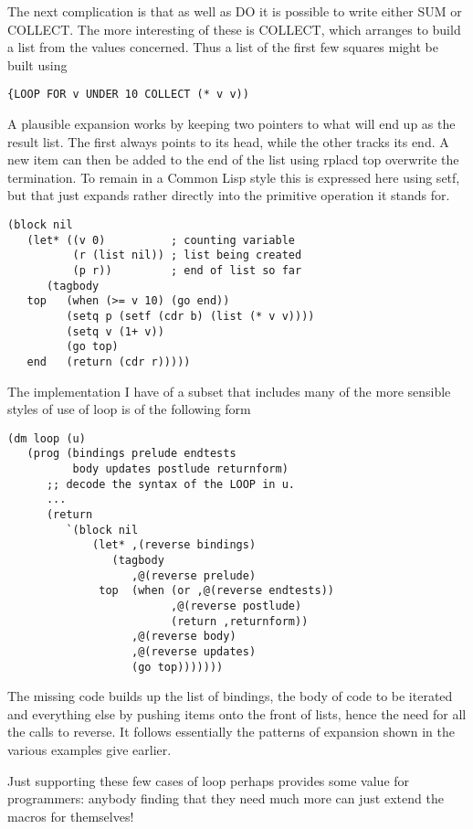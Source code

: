 The next complication is that as well as {\tx DO} it is possible to write
either {\tx SUM} or {\tx COLLECT}. The more interesting of these is
{\tx COLLECT}, which arranges to build a list from the values concerned.
Thus a list of the first few squares might be built using
{\small\begin{verbatim}
{LOOP FOR v UNDER 10 COLLECT (* v v))
\end{verbatim}}
A plausible expansion works by keeping two pointers to what
will end up as the result list. The first always points to its
head, while the other tracks its end. A new item can then
be added to the end of the list using {\tx rplacd} top overwrite
the termination. To remain in a Common Lisp style this is expressed
here using {\tx setf}, but that just expands rather directly into the
primitive operation it stands for.
{\small\begin{verbatim}
(block nil
   (let* ((v 0)          ; counting variable
          (r (list nil)) ; list being created
          (p r))         ; end of list so far
      (tagbody
   top   (when (>= v 10) (go end))
         (setq p (setf (cdr b) (list (* v v))))
         (setq v (1+ v))
         (go top)
   end   (return (cdr r)))))
\end{verbatim}}

The implementation I have of a subset that includes many of the more
sensible styles of use of {\tx loop} is of the following form
{\small\begin{verbatim}
(dm loop (u)
   (prog (bindings prelude endtests
          body updates postlude returnform)
      ;; decode the syntax of the LOOP in u.
      ...
      (return
         `(block nil
             (let* ,(reverse bindings)
                (tagbody
                   ,@(reverse prelude)
              top  (when (or ,@(reverse endtests))
                         ,@(reverse postlude)
                         (return ,returnform))
                   ,@(reverse body)
                   ,@(reverse updates)
                   (go top)))))))
\end{verbatim}}
The missing code builds up the list of bindings, the body of code to be
iterated and everything else by pushing items onto the front of
lists, hence the need for all the calls to {\tx reverse}. It follows
essentially the patterns of expansion shown in the various examples
give earlier.

Just supporting these few cases of {\tx loop} perhaps provides some value
for programmers: anybody finding that they need much more can just extend
the macros for themselves! 


